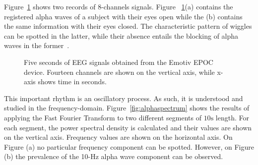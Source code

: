 Figure~\ref{fig:alphawavessignals} shows two records of 8-channels signals.  Figure ~\ref{fig:alphawavessignals}(a) contains the registered alpha waves of a subject with their eyes open while the (b) contains the same information with their eyes closed.  The characteristic pattern of wiggles can be spotted in the latter, while their absence entails the blocking of alpha waves in the former~\cite{Basar2012}. 


\begin{figure}[h!]
\centering
{}
\caption[Alpha Waves Wiggles]{Five seconds of EEG signals obtained from the Emotiv EPOC device.  Fourteen channels are shown on the vertical axis, while x-axis shows time in seconds.}
\label{fig:alphawavessignals}
\end{figure}

This important rhythm is an oscillatory process.  As such, it is understood and studied in the frequency-domain.   Figure~\ref{fig:alphaspectrum} shows the results of applying the Fast Fourier Transform to two different segments of $10\si{\second}$ length.  For each segment, the power spectral density is calculated and their values are shown on the vertical axis.  Frequency values are shown on the horizontal axis.   On Figure (a) no particular frequency component can be spotted.  However, on Figure (b) the prevalence of the 10-\si{\hertz} alpha wave component can be observed.   
 
